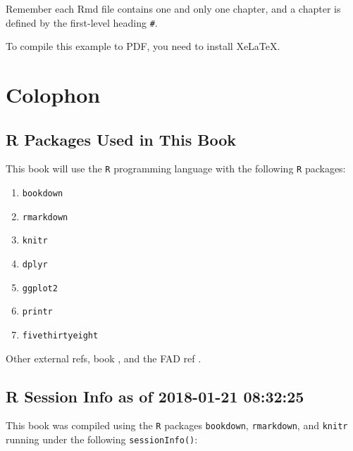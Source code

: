 \documentclass[]{book}
\providecommand{\tightlist}{%
  \setlength{\itemsep}{0pt}\setlength{\parskip}{0pt}}
\theoremstyle{definition}
\theoremstyle{definition}
\theoremstyle{definition}
\theoremstyle{remark}
\begin{document}
Remember each Rmd file contains one and only one chapter, and a chapter
is defined by the first-level heading \texttt{\#}.

To compile this example to PDF, you need to install XeLaTeX.

\section*{Colophon}\label{colophon}

\subsection*{R Packages Used in This
Book}\label{r-packages-used-in-this-book}

This book will use the \texttt{R} programming language \citep{R-base}
with the following \texttt{R} packages:

\begin{enumerate}
\def\labelenumi{\arabic{enumi}.}
\tightlist
\item
  \texttt{bookdown} \citep{R-bookdown}
\item
  \texttt{rmarkdown} \citep{R-rmarkdown}
\item
  \texttt{knitr} \citep{R-knitr}
\item
  \texttt{dplyr} \citep{R-dplyr}
\item
  \texttt{ggplot2} \citep{R-ggplot2}
\item
  \texttt{printr} \citep{R-printr}
\item
  \texttt{fivethirtyeight} \citep{R-fivethirtyeight}
\end{enumerate}

Other external refs, book \citep{xie2015}, and the FAD ref
\citep{Miller_Epstein_Bishop_Keitner_1985}.

\subsection*{R Session Info as of 2018-01-21
08:32:25}\label{r-session-info-as-of-2018-01-21-083225}

This book was compiled using the \texttt{R} packages \texttt{bookdown},
\texttt{rmarkdown}, and \texttt{knitr} running under the following
\texttt{sessionInfo()}:
\end{document}
